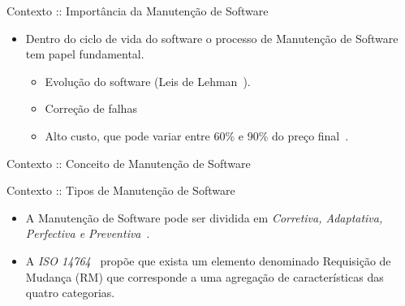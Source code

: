 \documentclass[t,14pt,mathserif]{beamer}
\begin{document}
\begin{frame}{Contexto :: Importância da Manutenção de Software}
	\begin{itemize}
        \item Dentro do ciclo de vida do software o processo de Manutenção de
            Software tem papel fundamental.
            \begin{itemize}
                \item Evolução do software (Leis de
                      Lehman~\cite{lehman1980understanding}).
                \item Correção de falhas
                \item Alto custo, que pode variar entre 60\% e 90\% do preço
                      final~\cite{kaur2015review}.
            \end{itemize}
	\end{itemize}
\end{frame}

\begin{frame}{Contexto :: Conceito de Manutenção de Software}
\end{frame}

\begin{frame}{Contexto :: Tipos de Manutenção de Software}
	\begin{itemize}

        \item A Manutenção de Software pode ser dividida em \textit{Corretiva,
              Adaptativa, Perfectiva e
              Preventiva}~\cite{Lientz:1980:SMM:601062,159342}.

        \item A \textit{ISO 14764}~\cite{1703974} propõe que exista um elemento
              denominado \alert{Requisição de Mudança (RM)} que corresponde a
              uma agregação de características das quatro categorias.

	\end{itemize}
\end{frame}
\end{document}
